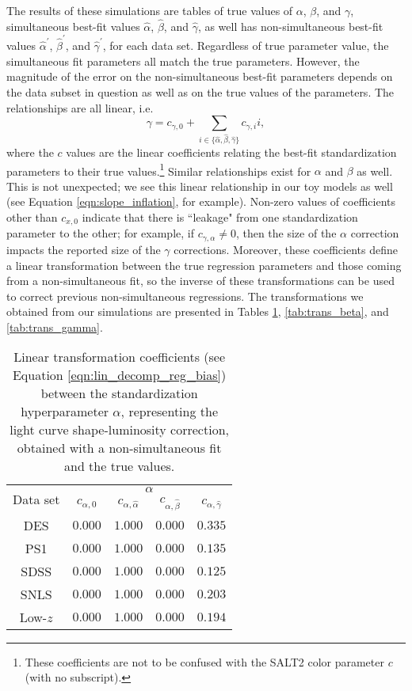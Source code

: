 The results of these simulations are tables of true values of $\alpha$, $\beta$, and $\gamma$, simultaneous best-fit values $\hat{\alpha}$, $\hat{\beta}$, and $\hat{\gamma}$, as well has non-simultaneous best-fit values $\hat{\alpha}^\prime$, $\hat{\beta}^\prime$, and $\hat{\gamma}^\prime$, for each data set. Regardless of true parameter value, the simultaneous fit parameters all match the true parameters. However, the magnitude of the error on the non-simultaneous best-fit parameters depends on the data subset in question as well as on the true values of the parameters. The relationships are all linear, i.e.
\begin{equation}
    \gamma = c_{\gamma, 0} + \displaystyle\sum_{i\in\{\hat{\alpha}, \hat{\beta}, \hat{\gamma}\}} c_{\gamma, i}i,
    \label{eqn:lin_decomp_reg_bias}
\end{equation}
where the $c$ values are the linear coefficients relating the best-fit standardization parameters to their true values.\footnote{These coefficients are not to be confused with the SALT2 color parameter $c$ (with no subscript).} Similar relationships exist for $\alpha$ and $\beta$ as well. This is not unexpected; we see this linear relationship in our toy models as well (see Equation \ref{eqn:slope_inflation}, for example). Non-zero values of coefficients other than $c_{x, 0}$ indicate that there is ``leakage" from one standardization parameter to the other; for example, if $c_{\gamma, \alpha} \neq 0$, then the size of the $\alpha$ correction impacts the reported size of the $\gamma$ corrections. Moreover, these coefficients define a linear transformation between the true regression parameters and those coming from a non-simultaneous fit, so the inverse of these transformations can be used to correct previous non-simultaneous regressions. The transformations we obtained from our simulations are presented in Tables \ref{tab:trans_alpha}, \ref{tab:trans_beta}, and \ref{tab:trans_gamma}.

\begin{table}[htbp]
\centering
    \begin{tabular}{ccccc}\toprule
    \multirow{2}{*}{Data set} &
    \multicolumn{4}{c}{$\alpha$}\\
       {}  &  $c_{\alpha, 0}$ & $c_{\alpha,\hat{\alpha}}$ & $c_{\alpha,\hat{\beta}}$ & $c_{\alpha,\hat{\gamma}}$\\\midrule
        DES & $0.000$ & $1.000$ & $0.000$ & $0.335$\\
        PS1 & $0.000$ & $1.000$ & $0.000$ & $0.135$\\
        SDSS & $0.000$ & $1.000$ & $0.000$ & $0.125$\\
        SNLS & $0.000$ & $1.000$ & $0.000$ & $0.203$\\
        Low-$z$ & $0.000$ & $1.000$ & $0.000$ & $0.194$\\
    \bottomrule
    \end{tabular}
    \caption{Linear transformation coefficients (see Equation \ref{eqn:lin_decomp_reg_bias}) between the standardization hyperparameter $\alpha$, representing the light curve shape-luminosity correction, obtained with a non-simultaneous fit and the true values.}
    \label{tab:trans_alpha}
\end{table}

